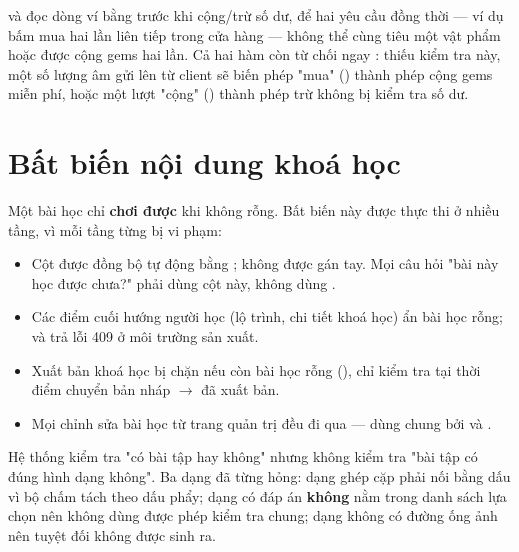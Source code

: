 \begin{luuy}
 và  đọc dòng ví bằng
 trước khi cộng/trừ số dư, để hai yêu cầu đồng thời — ví dụ
bấm mua hai lần liên tiếp trong cửa hàng — không thể cùng tiêu một vật phẩm hoặc được cộng
gems hai lần. Cả hai hàm còn từ chối ngay : thiếu kiểm tra này, một số
lượng âm gửi lên từ client sẽ biến phép "mua" () thành phép cộng gems
miễn phí, hoặc một lượt "cộng" () thành phép trừ không bị kiểm tra số dư.
\end{luuy}

\section{Bất biến nội dung khoá học}

Một bài học chỉ \textbf{chơi được} khi  không rỗng. Bất biến này
được thực thi ở nhiều tầng, vì mỗi tầng từng bị vi phạm:

\begin{itemize}[leftmargin=1.4em]
  \item Cột  được đồng bộ tự động bằng 
  ; không được gán tay. Mọi câu hỏi "bài này học được chưa?"
  phải dùng cột này, không dùng .
  \item Các điểm cuối hướng người học (lộ trình, chi tiết khoá học) ẩn bài học rỗng;
   và  trả lỗi 409 ở môi trường sản xuất.
  \item Xuất bản khoá học bị chặn nếu còn bài học rỗng
  (), chỉ kiểm tra tại thời điểm chuyển
  bản nháp $\rightarrow$ đã xuất bản.
  \item Mọi chỉnh sửa bài học từ trang quản trị đều đi qua 
  — dùng chung bởi  và .
\end{itemize}

\begin{luuy}
Hệ thống kiểm tra "có bài tập hay không" nhưng không kiểm tra "bài tập có đúng hình dạng
không". Ba dạng đã từng hỏng: dạng ghép cặp phải nối bằng dấu  vì bộ chấm tách
theo dấu phẩy; dạng  có đáp án \textbf{không} nằm trong danh
sách lựa chọn nên không dùng được phép kiểm tra chung; dạng 
không có đường ống ảnh nên tuyệt đối không được sinh ra.
\end{luuy}

